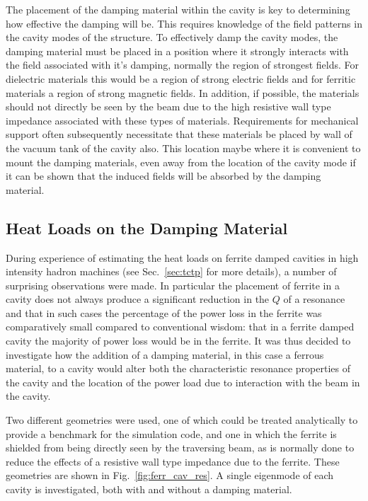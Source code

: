The placement of the damping material within the cavity is key to determining how effective the damping will be. This requires knowledge of the field patterns in the cavity modes of the structure. To effectively damp the cavity modes, the damping material must be placed in a position where it strongly interacts with the field associated with it's damping, normally the region of strongest fields. For dielectric materials this would be a region of strong electric fields and for ferritic materials a region of strong magnetic fields. In addition, if possible, the materials should not directly be seen by the beam due to the high resistive wall type impedance associated with these types of materials. Requirements for mechanical support often subsequently necessitate that these materials be placed by wall of the vacuum tank of the cavity also. This location maybe where it is convenient to mount the damping materials, even away from the location of the cavity mode if it can be shown that the induced fields will be absorbed by the damping material.

\subsection{Heat Loads on the Damping Material}

During experience of estimating the heat loads on ferrite damped cavities in high intensity hadron machines (see Sec.~\ref{sec:tctp} for more details), a number of surprising observations were made. In particular the placement of ferrite in a cavity does not always produce a significant reduction in the $Q$ of a resonance and that in such cases the percentage of the power loss in the ferrite was comparatively small compared to conventional wisdom: that in a ferrite damped cavity the majority of power loss would be in the ferrite. It was thus decided to investigate how the addition of a damping material, in this case a ferrous material, to a cavity would alter both the characteristic resonance properties of the cavity and the location of the power load due to interaction with the beam in the cavity.

Two different geometries were used, one of which could be treated analytically to provide a benchmark for the simulation code, and one in which the ferrite is shielded from being directly seen by the traversing beam, as is normally done to reduce the effects of a resistive wall type impedance due to the ferrite. These geometries are shown in Fig.~\ref{fig:ferr_cav_res}. A single eigenmode of each cavity is investigated, both with and without a damping material. 

